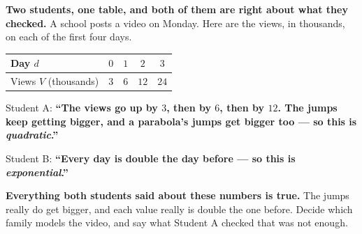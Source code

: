 \documentclass[10pt]{article}
\begin{document}
\vspace{0.10in}

\boxguard[12]
\begin{hookbox}
\small
\textbf{Two students, one table, and both of them are right about what they checked.} A school posts
a video on Monday. Here are the views, in thousands, on each of the first four days.

\smallskip
\begin{center}
\renewcommand{\arraystretch}{1.25}
\begin{tabular}{@{}|l|c|c|c|c|@{}}
\hline
Day $d$ & $0$ & $1$ & $2$ & $3$ \\ \hline
Views $V$ (thousands) & $3$ & $6$ & $12$ & $24$ \\
\hline
\end{tabular}
\end{center}

\smallskip
Student A: \textbf{``The views go up by $3$, then by $6$, then by $12$. The jumps keep getting
bigger, and a parabola's jumps get bigger too --- so this is \emph{quadratic}.''}

\smallskip
Student B: \textbf{``Every day is double the day before --- so this is \emph{exponential}.''}

\smallskip
\textbf{Everything both students said about these numbers is true.} The jumps really do get bigger,
and each value really is double the one before. Decide which family models the video, and say what
Student A checked that was not enough.

\\
\\
\end{hookbox}

\vspace{0.10in}
\end{document}
